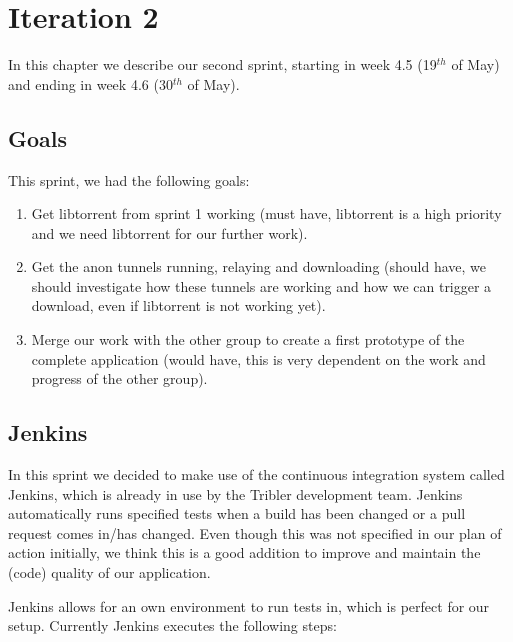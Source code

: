 \chapter{Iteration 2}
\label{iteration2}
	In this chapter we describe our second sprint, starting in week 4.5 (19$^{th}$ of May) and ending in week 4.6 (30$^{th}$ of May).

	\section{Goals}
		This sprint, we had the following goals:
	
		\begin{enumerate}
			\item Get libtorrent from sprint 1 working (must have, libtorrent is a high priority and we need libtorrent for our further work).
			\item Get the anon tunnels running, relaying and downloading (should have, we should investigate how these tunnels are working and how we can trigger a download, even if libtorrent is not working yet).
			\item Merge our work with the other group to create a first prototype of the complete application (would have, this is very dependent on the work and progress of the other group).
		\end{enumerate}
	
	\section{Jenkins}
		In this sprint we decided to make use of the continuous integration system called Jenkins, which is already in use by the Tribler development team. Jenkins automatically runs specified tests when a build has been changed or a pull request comes in/has changed. 
		Even though this was not specified in our plan of action initially, we think this is a good addition to improve and maintain the (code) quality of our application.
		
		Jenkins allows for an own environment to run tests in, which is perfect for our setup. Currently Jenkins executes the following steps:
		
